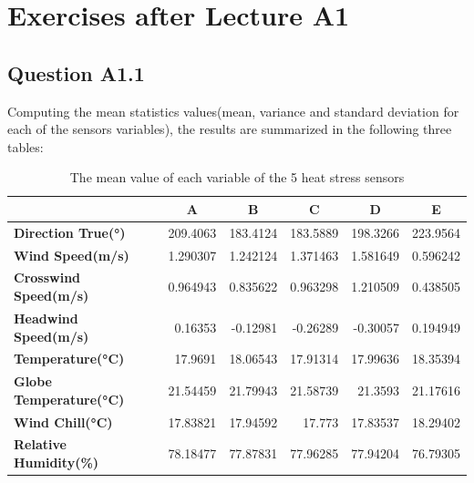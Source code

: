 \documentclass[a4paper]{article}
\begin{document}
\section{Exercises after Lecture A1}
\subsection{Question A1.1}

Computing the mean statistics values(mean, variance and standard deviation for each of the sensors variables), the results are summarized in the following three tables:

\begin{table}[htbp]
\footnotesize
  \centering
  \caption{The mean value of each variable of the 5 heat stress sensors}
    \begin{tabular}{lrrrrr}
    \toprule
          & \multicolumn{1}{c}{\textbf{A}} & \multicolumn{1}{c}{\textbf{B}} & \multicolumn{1}{c}{\textbf{C}} & \multicolumn{1}{c}{\textbf{D}} & \multicolumn{1}{c}{\textbf{E}} \\
    \midrule
    \textbf{Direction True(°)} & 209.4063 & \cellcolor[rgb]{ .608,  .804,  .608}183.4124 & 183.5889 & 198.3266 & \cellcolor[rgb]{ .98,  .502,  .447}223.9564 \\
    \textbf{Wind Speed(m/s)} & 1.290307 & 1.242124 & 1.371463 & \cellcolor[rgb]{ .98,  .502,  .447}1.581649 & \cellcolor[rgb]{ .608,  .804,  .608}0.596242 \\
    \textbf{Crosswind Speed(m/s)} & 0.964943 & 0.835622 & 0.963298 & \cellcolor[rgb]{ .98,  .502,  .447}1.210509 & \cellcolor[rgb]{ .608,  .804,  .608}0.438505 \\
    \textbf{Headwind Speed(m/s)} & \cellcolor[rgb]{ .98,  .502,  .447}0.16353 & -0.12981 & -0.26289 & \cellcolor[rgb]{ .608,  .804,  .608}-0.30057 & \cellcolor[rgb]{ .98,  .502,  .447}0.194949 \\
    \textbf{Temperature(°C)} & 17.9691 & 18.06543 & \cellcolor[rgb]{ .608,  .804,  .608}17.91314 & 17.99636 & \cellcolor[rgb]{ .98,  .502,  .447}18.35394 \\
    \textbf{Globe Temperature(°C)} & 21.54459 & 21.79943 & 21.58739 & 21.3593 & \cellcolor[rgb]{ .608,  .804,  .608}21.17616 \\
    \textbf{Wind Chill(°C)} & 17.83821 & 17.94592 & \cellcolor[rgb]{ .608,  .804,  .608}17.773 & 17.83537 & \cellcolor[rgb]{ .98,  .502,  .447}18.29402 \\
    \textbf{Relative Humidity(\%)} & 78.18477 & 77.87831 & 77.96285 & 77.94204 & \cellcolor[rgb]{ .608,  .804,  .608}76.79305 \\

\end{tabular}
\end{table}
\end{document}
